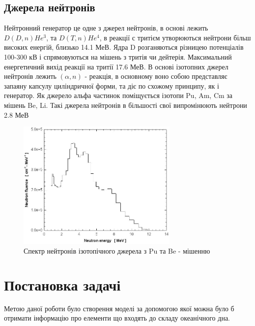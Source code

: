 \documentclass[a4paper, 14pt]{article}
\numberwithin{equation}{section}
\numberwithin{table}{section}
\begin{document}
\subsection{Джерела нейтронів}
Нейтронний генератор це одне з джерел нейтронів, в основі лежить $D(D,n)He^3 $, та $D(T, n)He^4$, в реакції с тритієм утворюються нейтрони більш високих енергій, близько 14.1 МеВ. Ядра D розганяються різницею потенціалів 100-300 кВ і спрямовуються на мішень з тритія чи дейтерія. Максимальний енергетичний вихід реакції на тритії 17.6 МеВ. 
В основі ізотопних джерел нейтронів лежить $(\alpha, n)$ - реакція, в основному воно собою представляє запаяну капсулу циліндричної форми, та діє по схожому принципу, як і генератор. Як джерело альфа частинок поміщується ізотопи Pu, Am, Cm за мішень Be, Li. Такі джерела нейтронів в більшості свої випромінюють нейтрони 2.8 МеВ
\begin{figure}[hbt!]
	\centering \includegraphics[width=0.7\textwidth]{images/239-PuBe-neutron-source-spectrum.png}
	\caption{Спектр нейтронів ізотопічного джерела з Pu та Be - мішенню} 
	\label{ris:neutron28Spectrum}	
\end{figure}
\newpage
\section{Постановка задачі}
\setcounter{figure}{0}
Метою даної роботи було створення моделі за допомогою якої можна було б отримати інформацію про елементи що входять до складу океанічного дна.
\end{document}
